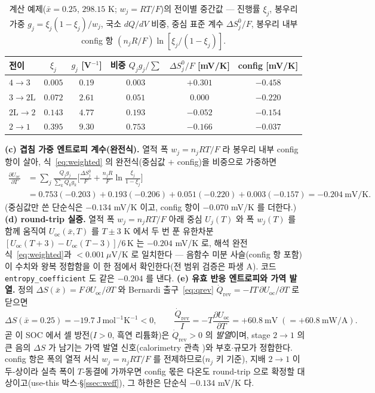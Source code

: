 \documentclass[11pt,a4paper]{article}
\newcommand{\rev}{\mathrm{rev}}
\newcommand{\oc}{\mathrm{oc}}
\begin{document}
\begin{table}[htbp]
\centering\small
\renewcommand{\arraystretch}{1.2}
\caption{계산 예제($\bar x{=}0.25$, $298.15$ K; $w_j{=}RT/F$)의 전이별 중간값 — 진행률 $\xi_j$, 봉우리 가중
$g_j=\xi_j(1-\xi_j)/w_j$, 국소 $dQ/dV$ 비중, 중심 표준 계수 $\Delta S^0_j/F$, 봉우리 내부 config 항 $(n_jR/F)\ln[\xi_j/(1-\xi_j)]$.}
\label{tab:worked}
\begin{tabular}{lccccc}
\toprule
전이 & $\xi_j$ & $g_j$ [V$^{-1}$] & 비중 $Q_jg_j/\!\sum$ & $\Delta S^0_j/F$ [mV/K] & config [mV/K] \\
\midrule
$4\!\to\!3$   & $0.005$ & $0.19$ & $0.003$ & $+0.301$ & $-0.458$ \\
$3\!\to\!2\mathrm L$ & $0.072$ & $2.61$ & $0.051$ & $0.000$ & $-0.220$ \\
$2\mathrm L\!\to\!2$ & $0.143$ & $4.77$ & $0.193$ & $-0.052$ & $-0.154$ \\
$2\!\to\!1$   & $0.395$ & $9.30$ & $0.753$ & $-0.166$ & $-0.037$ \\
\bottomrule
\end{tabular}
\end{table}
\textbf{(c) 겹침 가중 엔트로피 계수(완전식).} 열적 폭 $w_j{=}n_jRT/F$ 라 봉우리 내부 config 항이 살아,
식~\eqref{eq:weighted} 의 완전식(중심값 $+$ config)을 비중으로 가중하면
\begin{equation*}
\begin{aligned}
\frac{\partial U_\oc}{\partial T}
&=\sum_j\frac{Q_jg_j}{\sum_kQ_kg_k}\Big[\frac{\Delta S^0_j}{F}+\frac{n_jR}{F}\ln\frac{\xi_j}{1-\xi_j}\Big]\\
&=0.753(-0.203)+0.193(-0.206)+0.051(-0.220)+0.003(-0.157)
=-0.204\ \mathrm{mV/K}.
\end{aligned}
\end{equation*}
(중심값만 쓴 단순식은 $-0.134$ mV/K 이고, config 항이 $-0.070$ mV/K 를 더한다.)
\textbf{(d) round-trip 실증.} 열적 폭 $w_j{=}n_jRT/F$ 아래 중심 $U_j(T)$ 와 폭 $w_j(T)$ 를 함께 움직여
$U_\oc(\bar x,T)$ 를 $T\pm3$ K 에서 두 번 푼 유한차분 $[U_\oc(T{+}3)-U_\oc(T{-}3)]/6\,\mathrm K$ 는 $-0.204$ mV/K 로,
해석 완전식~\eqref{eq:weighted}과 $<\!0.001\ \mu$V/K 로 일치한다 --- 음함수 미분 사슬(config 항 포함)이 수치와
왕복 정합함을 이 한 점에서 확인한다(전 범위 검증은 파생 A). 코드 \texttt{entropy\_coefficient} 도 같은 $-0.204$ 를 낸다. \textbf{(e) 유효 반응 엔트로피와 가역 발열.} 정의 $\Delta S(\bar x)=F\,\partial U_\oc/\partial T$ 와
Bernardi 출구~\eqref{eq:qrev} $\dot Q_\rev=-IT\,\partial U_\oc/\partial T$ 로 닫으면
\begin{equation*}
\Delta S(\bar x{=}0.25)=-19.7\ \mathrm{J\,mol^{-1}K^{-1}}<0,
\qquad
\frac{\dot Q_\rev}{I}=-T\frac{\partial U_\oc}{\partial T}=+60.8\ \mathrm{mV}\;(=+60.8\ \mathrm{mW/A}).
\end{equation*}
곧 이 SOC 에서 셀 방전($I>0$, 흑연 리튬화)은 $\dot Q_\rev>0$ 의 \emph{발열}이며, stage $2\!\to\!1$ 의 큰 음의
$\Delta S$ 가 남기는 가역 발열 신호(calorimetry 관측 \cite{standardised2024})와 부호$\cdot$규모가 정합한다.
config 항은 폭의 열적 서식 $w_j{=}n_jRT/F$ 를 전제하므로($n_j$ 키 기준), 지배 $2\!\to\!1$ 이 두-상이라 실측 폭이
$T$-동결에 가까우면 config 몫은 다온도 round-trip 으로 확정할 대상이고(use-this 박스$\cdot$\S\ref{ssec:weff}),
그 하한은 단순식 $-0.134$ mV/K 다.
\end{document}
